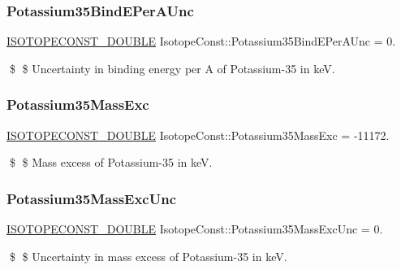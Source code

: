 \subsubsection{\texorpdfstring{Potassium35\+Bind\+E\+Per\+A\+Unc}{Potassium35BindEPerAUnc}}
{\footnotesize\ttfamily \mbox{\hyperlink{group___isotope_const-_macros_ga8f45a7272ce02c0b4c65c44636ed719a}{I\+S\+O\+T\+O\+P\+E\+C\+O\+N\+S\+T\+\_\+\+D\+O\+U\+B\+LE}} Isotope\+Const\+::\+Potassium35\+Bind\+E\+Per\+A\+Unc = 0.}

\$ \$ Uncertainty in binding energy per A of Potassium-\/35 in keV. \mbox{\label{group___isotope_const-_potassium-_k35_ga68d3213bbb6acae966e81e4d8c903b0c}} 
\subsubsection{\texorpdfstring{Potassium35\+Mass\+Exc}{Potassium35MassExc}}
{\footnotesize\ttfamily \mbox{\hyperlink{group___isotope_const-_macros_ga8f45a7272ce02c0b4c65c44636ed719a}{I\+S\+O\+T\+O\+P\+E\+C\+O\+N\+S\+T\+\_\+\+D\+O\+U\+B\+LE}} Isotope\+Const\+::\+Potassium35\+Mass\+Exc = -\/11172.}

\$ \$ Mass excess of Potassium-\/35 in keV. \mbox{\label{group___isotope_const-_potassium-_k35_ga60a20c16b6d724cf8a57c58da545d921}} 
\subsubsection{\texorpdfstring{Potassium35\+Mass\+Exc\+Unc}{Potassium35MassExcUnc}}
{\footnotesize\ttfamily \mbox{\hyperlink{group___isotope_const-_macros_ga8f45a7272ce02c0b4c65c44636ed719a}{I\+S\+O\+T\+O\+P\+E\+C\+O\+N\+S\+T\+\_\+\+D\+O\+U\+B\+LE}} Isotope\+Const\+::\+Potassium35\+Mass\+Exc\+Unc = 0.}

\$ \$ Uncertainty in mass excess of Potassium-\/35 in keV. \mbox{\label{group___isotope_const-_potassium-_k35_gabb10706b5d7ea012a6bbb10d11906165}} 
